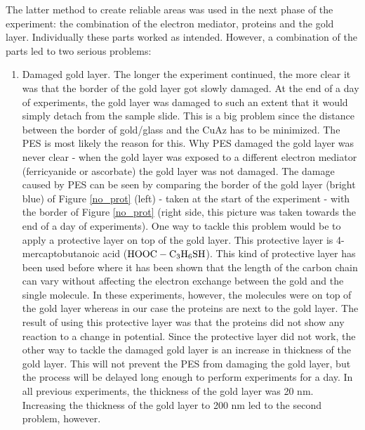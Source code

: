 \documentclass[twoside,single]{lion-msc}
\begin{document}
The latter method to create reliable areas was used in the next phase of the experiment: the combination of the electron mediator, proteins and the gold layer. Individually these parts worked as intended. However, a combination of the parts led to two serious problems:
\begin{enumerate}


\item Damaged gold layer.
The longer the experiment continued, the more clear it was that the border of the gold layer got slowly damaged. At the end of a day of experiments, the gold layer was damaged to such an extent that it would simply detach from the sample slide. This is a big problem since the distance between the border of gold/glass and the CuAz has to be minimized. The PES is most likely the reason for this. Why PES damaged the gold layer was never clear - when the gold layer was exposed to a different electron mediator (ferricyanide or ascorbate) the gold layer was not damaged. The damage caused by PES can be seen by comparing the border of the gold layer (bright blue) of Figure \ref{no_prot} (left) - taken at the start of the experiment -  with the border of Figure \ref{no_prot} (right side, this picture was taken towards the end of a day of experiments). One way to tackle this problem would be to apply a protective layer on top of the gold layer. This protective layer is 4-mercaptobutanoic acid ($\textup{HOOC}-\textup{C}_{3}\textup{H}_{6}\textup{SH}$). This kind of protective layer has been used before \cite{Elmalk2012} where it has been shown that the length of the carbon chain can vary without affecting the electron exchange between the gold and the single molecule. In these experiments, however, the molecules were on top of the gold layer whereas in our case the proteins are next to the gold layer. The result of using this protective layer was that the proteins did not show any reaction to a change in potential. Since the protective layer did not work, the other way to tackle the damaged gold layer is an increase in thickness of the gold layer. This will not prevent the PES from damaging the gold layer, but the process will be delayed long enough to perform experiments for a day. In all previous experiments, the thickness of the gold layer was 20 nm. Increasing the thickness of the gold layer to 200 nm led to the second problem, however.



\end{enumerate}
\end{document}

